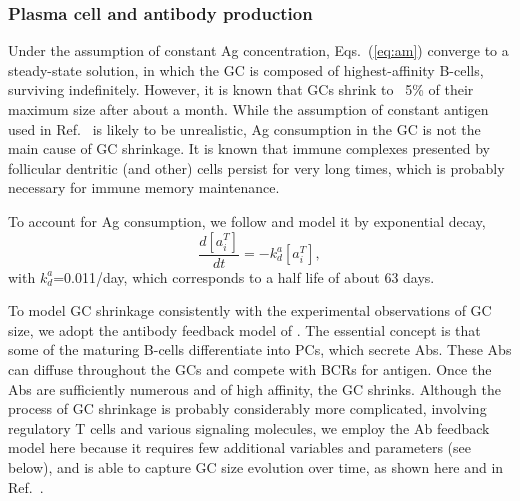 \documentclass[utf8]{frontiersHLTH}%
\newcommand{\td}[2]{\frac{d {#1}}{d {#2}}}
\newcommand{\vo}[1]{#1} %
\newcommand{\comment}[1]{} %
\begin{document}
\subsubsection{Plasma cell and antibody production}
Under the assumption of constant Ag concentration, Eqs.~(\ref{eq:am})
converge \comment{[A separate equation corresponds to each $i$ so I prefer plural]} to a
steady-state solution, in which the GC is composed of highest-affinity B-cells,
surviving indefinitely.\cite{kepler93} However, it is known that GCs
shrink to ~5\% of their maximum size after about a month.\cite{kelsoe95}
While the assumption of constant antigen used in Ref.~ is
likely to be unrealistic, Ag
consumption in the GC is not the main cause of GC shrinkage.  It is known that
immune complexes presented by follicular dentritic (and other) cells\cite{allen07}
persist for very long times, which is probably necessary for immune memory maintenance.\cite{Janeway8}

To account for Ag consumption, we follow \citet{rundell98} and model
\vo{it} by exponential decay,
\begin{equation}
 \td{[a^T_i]}{t}=-k_d^a[a^T_i],
\end{equation}
with $k_d^a$=0.011/day, which corresponds to a half life of about 63 days.

To model GC shrinkage consistently with the experimental observations of
GC size,\cite{wittenbrink11} we adopt the antibody feedback model
of \citet{zhang13}. The essential concept is that some of the maturing
B-cells differentiate into PCs, which secrete Abs. These Abs can diffuse
throughout the GCs and compete with BCRs for antigen. Once the Abs are
sufficiently numerous and of high affinity, the GC shrinks.
Although the process of GC shrinkage is probably considerably
more complicated, involving regulatory T cells and various signaling
molecules, we employ the Ab feedback model here because it requires few
additional variables and parameters (see below), and is able to capture
GC size evolution over time, as shown here and in Ref.~.
\end{document}
